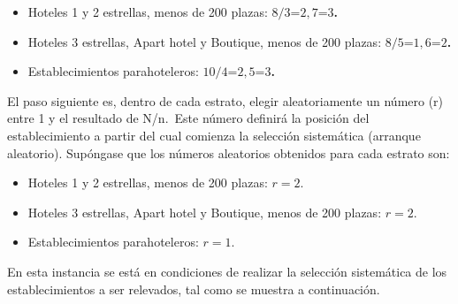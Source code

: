 \documentclass[
]{book}
\begin{document}
\begin{itemize}
\item
  Hoteles 1 y 2 estrellas, menos de 200 plazas: \(8/3\)=\(2,7\)=\(3\)\textbf{.}
\item
  Hoteles 3 estrellas, Apart hotel y Boutique, menos de 200 plazas: \(8/5\)=\(1,6\)=\(2\)\textbf{.}
\item
  Establecimientos parahoteleros: \(10/4\)=\(2,5\)=\(3\)\textbf{.}
\end{itemize}

El paso siguiente es, dentro de cada estrato, elegir aleatoriamente un número (r) entre 1 y el resultado de N/n.~Este número definirá la posición del establecimiento a partir del cual comienza la selección sistemática (arranque aleatorio). Supóngase que los números aleatorios obtenidos para cada estrato son:

\begin{itemize}
\item
  Hoteles 1 y 2 estrellas, menos de 200 plazas: \(r=2\).
\item
  Hoteles 3 estrellas, Apart hotel y Boutique, menos de 200 plazas: \(r=2\).
\item
  Establecimientos parahoteleros: \(r=1\).
\end{itemize}

En esta instancia se está en condiciones de realizar la selección sistemática de los establecimientos a ser relevados, tal como se muestra a continuación.
\end{document}
